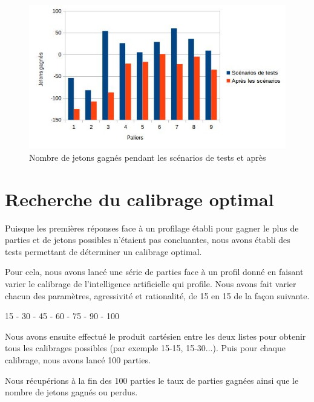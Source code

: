 \documentclass{report}
\begin{document}
\begin{figure}[H]
	\begin{center}
		\includegraphics[scale=0.5]{./imagesRapport/PremierCalibrageComparaisonJetonsGagnees.jpg}
	\end{center}
	\caption{Nombre de jetons gagnés pendant les scénarios de tests et après}
\end{figure}


\section{Recherche du calibrage optimal}

\hspace{0.5cm}Puisque les premières réponses face à un profilage établi pour gagner le plus de parties et de jetons possibles n'étaient pas concluantes, nous avons établi des tests permettant de déterminer un calibrage optimal.\par
Pour cela, nous avons lancé une série de parties face à un profil donné en faisant varier le calibrage de l'intelligence artificielle qui profile. Nous avons fait varier chacun des paramètres, agressivité et rationalité, de 15 en 15 de la façon suivante.\\

\begin{center}
15 - 30 - 45 - 60 - 75 - 90 - 100
\end{center}


Nous avons ensuite effectué le produit cartésien entre les deux listes pour obtenir tous les calibrages possibles (par exemple 15-15, 15-30...). Puis pour chaque calibrage, nous avons lancé 100 parties.\par

Nous récupérions à la fin des 100 parties le taux de parties gagnées ainsi que le nombre de jetons gagnés ou perdus.\\
\end{document}
